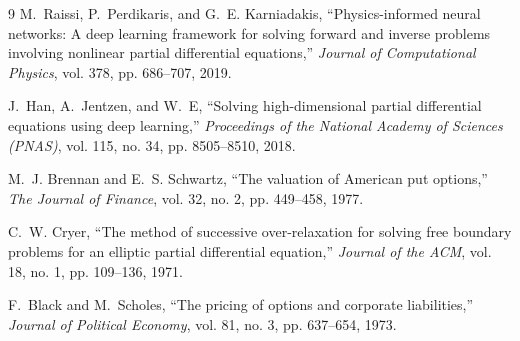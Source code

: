 ﻿\documentclass[10.5pt,a4paper]{article}
\begin{document}
\vspace{-1.2em}
\begin{thebibliography}{9}
\footnotesize
\setlength{\itemsep}{0.05em}
M.~Raissi, P.~Perdikaris, and G.~E. Karniadakis, ``Physics-informed neural networks: A deep learning framework for solving forward and inverse problems involving nonlinear partial differential equations,'' \emph{Journal of Computational Physics}, vol. 378, pp. 686--707, 2019.

J.~Han, A.~Jentzen, and W.~E, ``Solving high-dimensional partial differential equations using deep learning,'' \emph{Proceedings of the National Academy of Sciences (PNAS)}, vol. 115, no. 34, pp. 8505--8510, 2018.

M.~J. Brennan and E.~S. Schwartz, ``The valuation of American put options,'' \emph{The Journal of Finance}, vol. 32, no. 2, pp. 449--458, 1977.

C.~W. Cryer, ``The method of successive over-relaxation for solving free boundary problems for an elliptic partial differential equation,'' \emph{Journal of the ACM}, vol. 18, no. 1, pp. 109--136, 1971.

F.~Black and M.~Scholes, ``The pricing of options and corporate liabilities,'' \emph{Journal of Political Economy}, vol. 81, no. 3, pp. 637--654, 1973.
\end{thebibliography}
\end{document}
